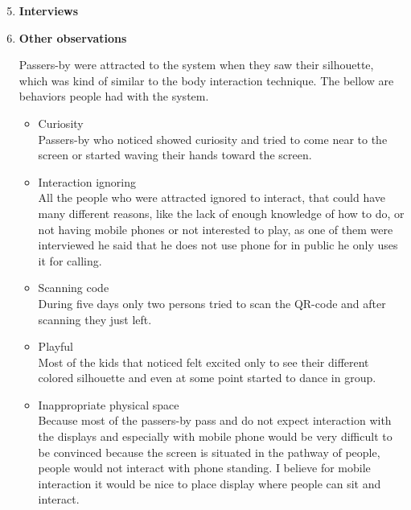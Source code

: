 \begin{enumerate}
\setcounter{enumi}{4}

\item \textbf{Interviews}




\newpage
\item \textbf{Other observations}


Passers-by were attracted to the system when they saw their silhouette, which was kind of similar to the body interaction technique. The bellow are behaviors people had with the system.

\begin{itemize}
\item Curiosity \\
Passers-by who noticed showed curiosity and tried to come near to the screen or started waving their hands toward the screen.
 
\item Interaction ignoring \\
All the people who were attracted ignored to interact, that could have many different reasons, like the lack of enough knowledge of how to do, or not having mobile phones or not interested to play, as one of them were interviewed he said that he does not use phone for in public he only uses it for calling. 

\item Scanning code \\ 
During five days only two persons tried to scan the QR-code and after scanning they just left.

\item Playful   \\
Most of the kids that noticed felt excited only to see their different colored silhouette and even at some point started to dance in group. 



\item Inappropriate physical space \\
Because most of the passers-by pass and do not expect interaction with the displays and especially with mobile phone would be very difficult to be convinced because the screen is situated in the pathway of people, people would not interact with phone standing. I believe for mobile interaction it would be nice to place display where people can sit and interact.


\end{itemize}
\end{enumerate}
